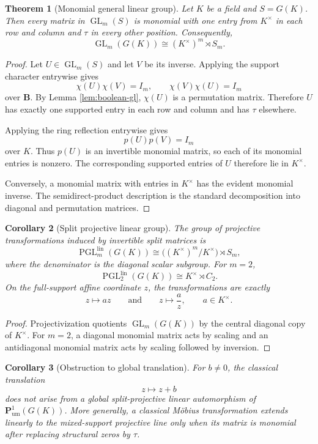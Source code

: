 \documentclass[11pt]{amsart}
\numberwithin{equation}{section}
\newtheorem{theorem}{Theorem}[section]
\newtheorem{corollary}[theorem]{Corollary}
\theoremstyle{definition}
\newcommand{\B}{\mathbf B}
\newcommand{\GL}{\operatorname{GL}}
\newcommand{\Pum}{\mathbf P_{\mathrm{um}}}
\begin{document}
\begin{theorem}[Monomial general linear group]\label{thm:monomial-gl}
Let $K$ be a field and $S=G(K)$.  Then every matrix in $\GL_m(S)$ is monomial with one entry from $K^\times$ in each row and column and $\tau$ in every other position.  Consequently,
\[
\boxed{
\GL_m(G(K))\cong(K^\times)^m\rtimes S_m.}
\]
\end{theorem}

\begin{proof}
Let $U\in\GL_m(S)$ and let $V$ be its inverse.  Applying the support character entrywise gives
\[
\chi(U)\chi(V)=I_m,
\qquad
\chi(V)\chi(U)=I_m
\]
over $\B$.  By Lemma \ref{lem:boolean-gl}, $\chi(U)$ is a permutation matrix.  Therefore $U$ has exactly one supported entry in each row and column and has $\tau$ elsewhere.

Applying the ring reflection entrywise gives
\[
p(U)p(V)=I_m
\]
over $K$.  Thus $p(U)$ is an invertible monomial matrix, so each of its monomial entries is nonzero.  The corresponding supported entries of $U$ therefore lie in $K^\times$.

Conversely, a monomial matrix with entries in $K^\times$ has the evident monomial inverse.  The semidirect-product description is the standard decomposition into diagonal and permutation matrices.
\end{proof}

\begin{corollary}[Split projective linear group]\label{cor:split-pgl}
The group of projective transformations induced by invertible split matrices is
\[
\operatorname{PGL}^{\mathrm{lin}}_m(G(K))
\cong
\bigl((K^\times)^m/K^\times\bigr)\rtimes S_m,
\]
where the denominator is the diagonal scalar subgroup.  For $m=2$,
\[
\operatorname{PGL}^{\mathrm{lin}}_2(G(K))
\cong
K^\times\rtimes C_2.
\]
On the full-support affine coordinate $z$, the transformations are exactly
\[
z\longmapsto az
\qquad\text{and}\qquad
z\longmapsto\frac{a}{z},
\qquad a\in K^\times.
\]
\end{corollary}

\begin{proof}
Projectivization quotients $\GL_m(G(K))$ by the central diagonal copy of $K^\times$.  For $m=2$, a diagonal monomial matrix acts by scaling and an antidiagonal monomial matrix acts by scaling followed by inversion.
\end{proof}

\begin{corollary}[Obstruction to global translation]\label{cor:no-global-translation}
For $b\neq0$, the classical translation
\[
z\longmapsto z+b
\]
does not arise from a global split-projective linear automorphism of $\Pum^1(G(K))$.  More generally, a classical M\"obius transformation extends linearly to the mixed-support projective line only when its matrix is monomial after replacing structural zeros by $\tau$.
\end{corollary}
\end{document}
